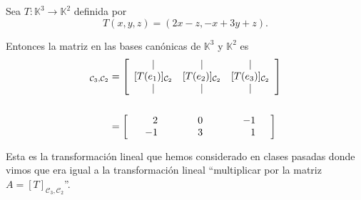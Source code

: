 \documentclass[handout]{beamer} %
\newcommand{\K}{\mathbb K}
\newcommand{\cC}{\mathcal{C}}
\begin{document}
    \begin{frame}
    
    
        \begin{ejemplo}
        Sea $T:\K^3\longrightarrow\K^2$ definida por 
        $$T(x,y,z)=(2x-z,-x+3y+z).$$
        
        Entonces la matriz en las bases canónicas de $\K^3$ y $\K^2$ es
        \begin{align*}
        [T]_{\cC_3,\cC_2}
        &=\left[
        \begin{array}{ccc}
        \mid& \mid& \mid\\
        $[$T(e_1)$]$_{\cC_2}&$[$T(e_2)$]$_{\cC_2}&$[$T(e_3)$]$_{\cC_2}\\
        \mid& \mid& \mid
        \end{array}
        \right]\\
        \\
        &=\left[
        \begin{array}{rrr}
        \quad\quad2&\quad\quad\quad0&\quad\quad\quad-1\quad\\-1&3&1\quad
        \end{array}
        \right]
        \end{align*}
        
        Esta es la transformación lineal que hemos considerado en clases pasadas donde vimos que era igual a la transformación lineal ``multiplicar por la matriz $A=[T]_{\cC_3,\cC_2}$''.
        \end{ejemplo}
        
        
        \end{frame}
        
        
        
\end{document}

